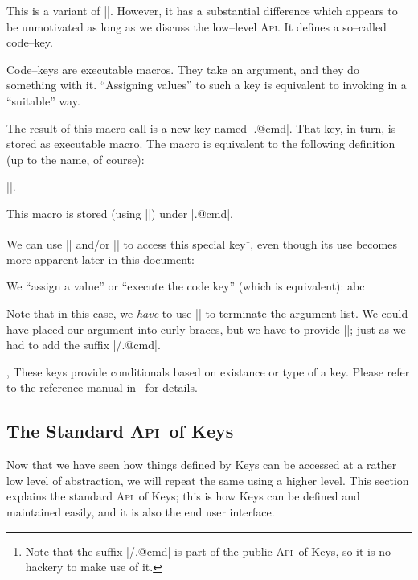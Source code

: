 \documentclass[a4paper]{ltxdoc}
\def\API{\textsc{Api}}%
\begin{document}
\begin{command}{\pgfkeysdef{}}
	This is a variant of |\pgfkeyssetvalue|. However, it has a substantial difference which appears to be unmotivated as long as we discuss the low--level \API. It defines a so--called code--key.

	Code--keys are executable macros. They take an argument, and they do something with it. ``Assigning values'' to such a key is equivalent to invoking  in a ``suitable'' way.

	The result of this macro call is a new key named |.@cmd|. That key, in turn, is stored as executable macro. The macro is equivalent to the following definition (up to the name, of course):

	|\def\macro#1\pgfeov|.

	This macro is stored (using |\pgfkeyslet|) under |.@cmd|. 

	We can use |\pgfkeysgetvalue| and/or |\pgfkeysvalueof| to access this special key\footnote{Note that the suffix |/.@cmd| is part of the public \API\ of \PGF Keys, so it is no hackery to make use of it.}, even though its use becomes more apparent later in this document: 

\begin{codeexample}[]
%

We ``assign a value'' or ``execute the code key'' (which is equivalent): 
abc\pgfeov
\end{codeexample}
	Note that in this case, we \emph{have} to use |\pgfeov| to terminate the argument list. We could have placed our argument into curly braces, but we have to provide |\pgfeov|; just as we had to add the suffix |/.@cmd|. 

\end{command}

\begin{commandlist}{%
	\pgfkeysifdefined{},
	\pgfkeysifassignable{}}
	These keys provide conditionals based on existance or type of a key. Please refer to the reference manual in~\cite{tikz} for details.
\end{commandlist}

\subsection{The Standard \API\ of \PGF Keys}
\begingroup
{}
Now that we have seen how things defined by \PGF Keys can be accessed at a rather low level of abstraction, we will repeat the same using a higher level. This section explains the standard \API\ of \PGF Keys; this is how Keys can be defined and maintained easily, and it is also the end user interface.
\end{document}
